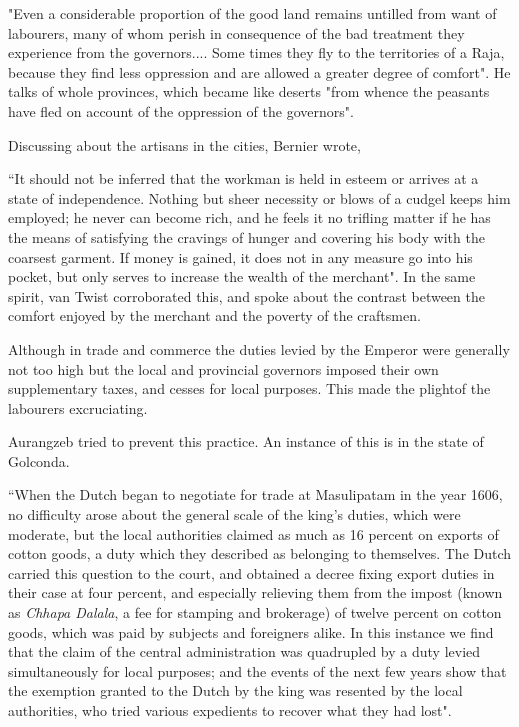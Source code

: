 \begin{myquote}
"Even a considerable proportion of the good land remains untilled from want of labourers, many of whom perish in consequence of the bad treatment they experience from the governors.... Some times they fly to the territories of a Raja, because they find less oppression and are allowed a greater degree of comfort". He talks of whole provinces, which became like deserts "from whence the peasants have fled on account of the oppression of the governors".
\end{myquote}

Discussing about the artisans in the cities, Bernier wrote,

\begin{myquote}
``It should not be inferred that the workman is held in esteem or arrives at a state of independence. Nothing but sheer necessity or blows of a cudgel keeps him employed; he never can become rich, and he feels it no trifling matter if he has the means of satisfying the cravings of hunger and covering his body with the coarsest garment. If money is gained, it does not in any measure go into his pocket, but only serves to increase the wealth of the merchant". In the same spirit, van Twist corroborated this, and spoke about the contrast between the comfort enjoyed by the merchant and the poverty of the craftsmen.
\end{myquote}

Although in trade and commerce the duties levied by the Emperor were generally not too high but the local and provincial governors imposed their own supplementary taxes, and cesses for local purposes. This made the plightof the labourers excruciating.

Aurangzeb tried to prevent this practice. An instance of this is in the state of Golconda.

\begin{myquote}
``When the Dutch began to negotiate for trade at Masulipatam in the year 1606, no difficulty arose about the general scale of the king's duties, which were moderate, but the local authorities claimed as much as 16 percent on exports of cotton goods, a duty which they described as belonging to themselves. The Dutch carried this question to the court, and obtained a decree fixing export duties in their case at four percent, and especially relieving them from the impost (known as \textit{Chhapa Dalala}, a fee for stamping and brokerage) of twelve percent on cotton goods, which was paid by subjects and foreigners alike. In this instance we find that the claim of the central administration was quadrupled by a duty levied simultaneously for local purposes; and the events of the next few years show that the exemption granted to the Dutch by the king was resented by the local authorities, who tried various expedients to recover what they had lost".
\end{myquote}

